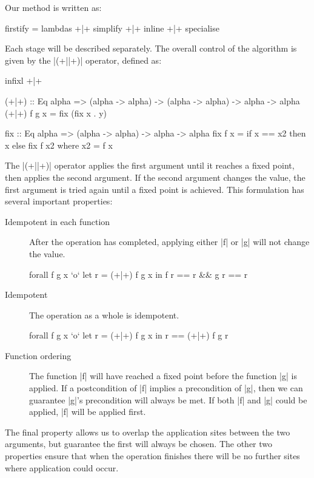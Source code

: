 \documentclass[preprint]{sigplanconf}
\begin{document}
Our method is written as:

\begin{code}
firstify = lambdas +|+ simplify +|+ inline +|+ specialise
\end{code}

Each stage will be described separately. The overall control of the algorithm is given by the |(+||+)| operator, defined as:

\begin{code}
infixl +|+

(+|+) :: Eq alpha => (alpha -> alpha) -> (alpha -> alpha) -> alpha -> alpha
(+|+) f g x  = fix (fix x . y)

fix :: Eq alpha => (alpha -> alpha) -> alpha -> alpha
fix f x = if x == x2 then x else fix f x2
    where x2 = f x
\end{code}

The |(+||+)| operator applies the first argument until it reaches a fixed point, then applies the second argument. If the second argument changes the value, the first argument is tried again until a fixed point is achieved. This formulation has several important properties:

\begin{description}
\item[Idempotent in each function] After the operation has completed, applying either |f| or |g| will not change the value.

\begin{code}
forall f g x `o` let r = (+|+) f g x in f r == r && g r == r
\end{code}

\item[Idempotent] The operation as a whole is idempotent.

\begin{code}
forall f g x `o` let r = (+|+) f g x in r == (+|+) f g r
\end{code}

\item[Function ordering] The function |f| will have reached a fixed point before the function |g| is applied. If a postcondition of |f| implies a precondition of |g|, then we can guarantee |g|'s precondition will always be met. If both |f| and |g| could be applied, |f| will be applied first.
\end{description}

The final property allows us to overlap the application sites between the two arguments, but guarantee the first will always be chosen. The other two properties ensure that when the operation finishes there will be no further sites where application could occur.
\end{document}
